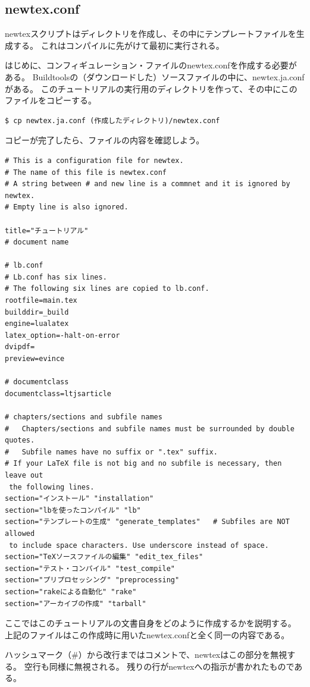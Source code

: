 \subsection{newtex.conf}
newtexスクリプトはディレクトリを作成し、その中にテンプレートファイルを生成する。
これはコンパイルに先がけて最初に実行される。

はじめに、コンフィギュレーション・ファイルのnewtex.confを作成する必要がある。
Buildtoolsの（ダウンロードした）ソースファイルの中に、newtex.ja.confがある。
このチュートリアルの実行用のディレクトリを作って、その中にこのファイルをコピーする。
\begin{verbatim}
$ cp newtex.ja.conf (作成したディレクトリ)/newtex.conf
\end{verbatim}
コピーが完了したら、ファイルの内容を確認しよう。
\begin{verbatim}
# This is a configuration file for newtex.
# The name of this file is newtex.conf
# A string between # and new line is a commnet and it is ignored by newtex.
# Empty line is also ignored. 

title="チュートリアル"
# document name

# lb.conf
# Lb.conf has six lines.
# The following six lines are copied to lb.conf.
rootfile=main.tex
builddir=_build
engine=lualatex
latex_option=-halt-on-error
dvipdf=
preview=evince

# documentclass
documentclass=ltjsarticle

# chapters/sections and subfile names
#   Chapters/sections and subfile names must be surrounded by double quotes.
#   Subfile names have no suffix or ".tex" suffix.
# If your LaTeX file is not big and no subfile is necessary, then leave out
 the following lines.
section="インストール" "installation"
section="lbを使ったコンパイル" "lb"
section="テンプレートの生成" "generate_templates"   # Subfiles are NOT allowed
 to include space characters. Use underscore instead of space. 
section="TeXソースファイルの編集" "edit_tex_files"
section="テスト・コンパイル" "test_compile"
section="プリプロセッシング" "preprocessing"
section="rakeによる自動化" "rake"
section="アーカイブの作成" "tarball"
\end{verbatim}
ここではこのチュートリアルの文書自身をどのように作成するかを説明する。
上記のファイルはこの作成時に用いたnewtex.confと全く同一の内容である。

ハッシュマーク（\#）から改行まではコメントで、newtexはこの部分を無視する。
空行も同様に無視される。
残りの行がnewtexへの指示が書かれたものである。

